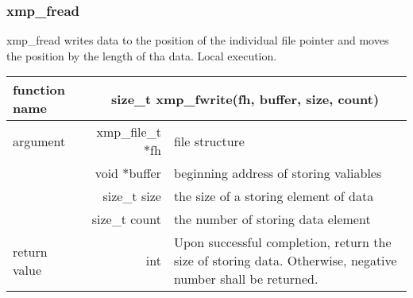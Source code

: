    \subsubsection{xmp\_fread}
   xmp\_fread writes data to the position of the individual file
   pointer and moves the position by the length of tha data.
   Local execution.

   \begin{table}[h]
    \begin{center}
     \begin{tabular}{|l|r|p{80mm}|}
      \hline
      {\bf function name}  & \multicolumn{2}{c|}{\bf size\_t
      xmp\_fwrite(fh, buffer, size, count)} \\ \hline \hline
      argument & xmp\_file\_t $*$fh & file structure \\ \cline{2-3}
      & void $*$buffer & beginning address of storing valiables \\ \cline{2-3}
      & size\_t size & the size of a storing element of data \\ \cline{2-3}
      & size\_t count & the number of storing data element \\ \hline
      return value & int & Upon successful completion, return the size
	      of storing data. Otherwise, negative number shall be
	      returned. \\ \hline
      \end{tabular}
     \end{center}
    \label{tb:aaa}
   \end{table}

   
